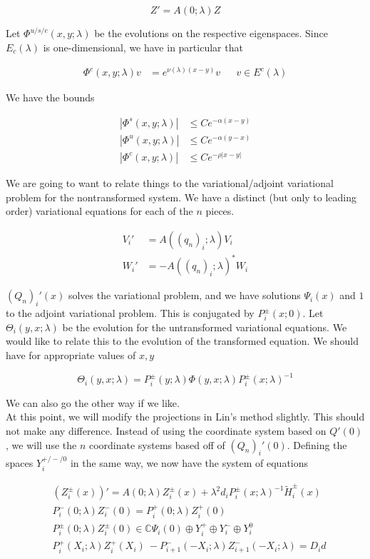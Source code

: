 \documentclass[12pt]{article}
\def\C{{\mathbb C}}
\begin{document}
\[
Z' = A(0; \lambda) Z
\]

Let $\Phi^{u/s/c}(x, y; \lambda)$ be the evolutions on the respective eigenspaces. Since $E_c(\lambda)$ is one-dimensional, we have in particular that

\begin{align*}
\Phi^c(x, y; \lambda) v &= e^{\nu(\lambda)(x - y)} v && v \in E^c(\lambda)
\end{align*}

We have the bounds

\begin{align*}
|\Phi^s(x, y; \lambda)| &\leq C e^{-\alpha(x - y)} \\
|\Phi^u(x, y; \lambda)| &\leq C e^{-\alpha(y - x)} \\
|\Phi^c(x, y; \lambda)| &\leq C e^{-\rho|x - y|} 
\end{align*}

We are going to want to relate things to the variational/adjoint variational problem for the nontransformed system. We have a distinct (but only to leading order) variational equations for each of the $n$ pieces.

\begin{align*}
V_i' &= A((q_n)_i; \lambda) V_i \\
W_i' &= -A((q_n)_i; \lambda)^* W_i
\end{align*}

$(Q_n)_i'(x)$ solves the variational problem, and we have solutions $\Psi_i(x)$ and $1$ to the adjoint variational problem. This is conjugated by $P_i^\pm(x; 0)$. Let $\Theta_i(y, x; \lambda)$ be the evolution for the untransformed variational equations. We would like to relate this to the evolution of the transformed equation. We should have for appropriate values of $x, y$

\[
\Theta_i(y, x; \lambda) = P_i^\pm(y; \lambda) \Phi(y, x; \lambda) P_i^\pm(x; \lambda)^{-1}
\]

We can also go the other way if we like.\\

At this point, we will modify the projections in Lin's method slightly. This should not make any difference. Instead of using the coordinate system based on $Q'(0)$, we will use the $n$ coordinate systems based off of $(Q_n)_i'(0)$. Defining the spaces $Y_i^{+/-/0}$ in the same way, we now have the system of equations

\begin{align*}
&(Z_i^\pm(x))' = A(0; \lambda) Z_i^\pm(x) + \lambda^2 d_i P_i^\pm(x; \lambda)^{-1} \tilde{H}_i^\pm(x) \\
&P_i^-(0; \lambda) Z_i^-(0) = P_i^+(0; \lambda) Z_i^+(0) \\
&P_i^\pm(0; \lambda) Z_i^\pm(0) \in \C \Psi_i(0) \oplus Y_i^+ \oplus Y_i^- \oplus Y_i^0 \\
&P_i^+(X_i; \lambda) Z_i^+(X_i)\ - P_{i+1}^-(-X_i; \lambda) Z_{i+1}^-(-X_i; \lambda) = D_i d
\end{align*}
\end{document}
